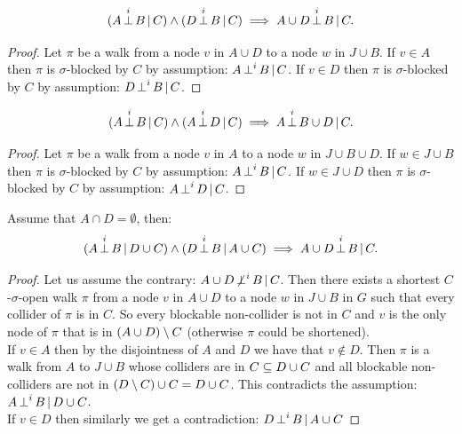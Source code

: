 \begin{Lem}
    \[ (A \operatorname*{\perp}^i  B \operatorname*{|}  C) \land (D \operatorname*{\perp}^i  B \operatorname*{|} C) \implies A \cup D \operatorname*{\perp}^i  B \operatorname*{|} C.\]
\begin{proof}
    Let $\pi$ be a walk from a node $v$ in $A \cup D$ to a node $w$ in $J \cup B$.
    If $v \in A$ then $\pi$ is $\sigma$-blocked by $C$ by assumption: $A \operatorname*{\perp}^i  B \operatorname*{|}  C$.
    If $v \in D$ then $\pi$ is $\sigma$-blocked by $C$ by assumption: $D \operatorname*{\perp}^i  B \operatorname*{|}  C$.
\end{proof}
\end{Lem}

\begin{Lem}
    \[ (A \operatorname*{\perp}^i  B \operatorname*{|}  C) \land (A \operatorname*{\perp}^i  D \operatorname*{|} C) \implies A \operatorname*{\perp}^i  B \cup  D \operatorname*{|} C.\]
\begin{proof}
    Let $\pi$ be a walk from a node $v$ in $A$ to a node $w$ in  $J \cup B \cup D$.
    If $w \in J \cup B$ then $\pi$ is $\sigma$-blocked by $C$ by assumption: $A \operatorname*{\perp}^i  B \operatorname*{|}  C$.
    If $w \in J \cup D$ then $\pi$ is $\sigma$-blocked by $C$ by assumption: $A \operatorname*{\perp}^i  D \operatorname*{|}  C$.
\end{proof}
\end{Lem}

\begin{Lem} Assume that $A \cap D = \emptyset$, then:
    \[ (A \operatorname*{\perp}^i  B \operatorname*{|} D \cup  C) \land (D \operatorname*{\perp}^i  B \operatorname*{|} A \cup C) \implies A \cup D \operatorname*{\perp}^i  B \operatorname*{|}   C.\]
\begin{proof}
    Let us assume the contrary:  $A \cup D \operatorname*{\not\perp}^i  B \operatorname*{|} C$.
    Then there exists a shortest $C$-$\sigma$-open walk $\pi$ 
    from a node $v$ in $A \cup D$ to a node $w$ in $J \cup B $ in $G$ such that every collider of $\pi$ is in $C$.
    So every blockable non-collider is not in $C$ and $v$ is 
    the only node of $\pi$ that is in $(A \cup D)\setminus C$ (otherwise $\pi$ could be shortened). \\
    If $v \in A$ then by the disjointness of $A$ and $D$ we have that $v \notin D$. 
    Then $\pi$ is a walk from $A$ to $J \cup B$ whose colliders are in $C \subseteq D \cup C$ 
    and all blockable non-colliders are not in $(D \setminus C) \cup C =D \cup C$. This contradicts the assumption: $A \operatorname*{\perp}^i  B \operatorname*{|} D \cup  C$.\\
    If $v \in D$ then similarly we get a contradiction: $D \operatorname*{\perp}^i  B \operatorname*{|} A \cup  C$
\end{proof}
\end{Lem}

